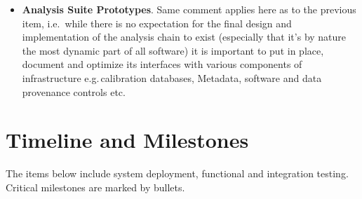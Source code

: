\documentclass[pdftex,12pt,letter]{article}
\begin{document}
\begin{itemize}
\item \textbf{Analysis Suite Prototypes}. Same comment applies here as to the previous item, i.e.\, while there is no expectation
for the final design and implementation of the analysis chain to exist (especially that it's by nature the most dynamic part of all
software) it is important to put in place, document and optimize its interfaces with various components of infrastructure e.g.\,calibration
databases, Metadata, software and data provenance controls etc.

\end{itemize}

\section{Timeline and Milestones}
\label{sec:timeline}
The items below include system deployment, functional and integration testing.
Critical milestones are marked by bullets.
\end{document}
